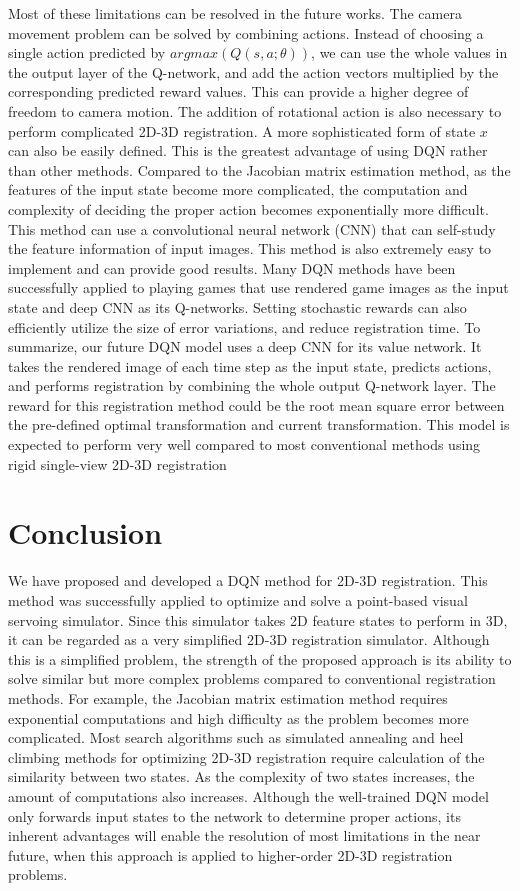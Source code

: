 \documentclass[10pt]{article}
\begin{document}
  Most of these limitations can be resolved in the future works. The camera movement problem can be solved by combining actions. Instead of choosing a single action predicted by $argmax(Q(s, a; \theta ))$, we can use the whole values in the output layer of the Q-network, and add the action vectors multiplied by the corresponding predicted reward values. This can provide a higher degree of freedom to camera motion. The addition of rotational action is also necessary to perform complicated 2D-3D registration. A more sophisticated form of state $x$ can also be easily defined. This is the greatest advantage of using DQN rather than other methods. Compared to the Jacobian matrix estimation method, as the features of the input state become more complicated, the computation and complexity of deciding the proper action becomes exponentially more difficult.
  This method can use a convolutional neural network (CNN) that can self-study the feature information of input images. This method is also extremely easy to implement and can provide good results. Many DQN methods have been successfully applied to playing games that use rendered game images as the input state and deep CNN as its Q-networks\cite{ref2}. Setting stochastic rewards can also efficiently utilize the size of error variations, and reduce registration time. To summarize, our future DQN model uses a deep CNN for its value network. It takes the rendered image of each time step as the input state, predicts actions, and performs registration by combining the whole output Q-network layer. The reward for this registration method could be the root mean square error between the pre-defined optimal transformation and current transformation. This model is expected to perform very well compared to most conventional methods using rigid single-view 2D-3D registration



\section{Conclusion}

We have proposed and developed a DQN method for 2D-3D registration. This method was successfully applied to optimize and solve a point-based visual servoing simulator. Since this simulator takes 2D feature states to perform in 3D, it can be regarded as a very simplified 2D-3D registration simulator. Although this is a simplified problem, the strength of the proposed approach is its ability to solve similar but more complex problems compared to conventional registration methods. For example, the Jacobian matrix estimation method requires exponential computations and high difficulty as the problem becomes more complicated. Most search algorithms such as simulated annealing and heel climbing methods for optimizing 2D-3D registration require calculation of the similarity between two states. As the complexity of two states increases, the amount of computations also increases. Although the well-trained DQN model only forwards input states to the network to determine proper actions, its inherent advantages will enable the resolution of most limitations in the near future, when this approach is applied to higher-order 2D-3D registration problems.
\end{document}
